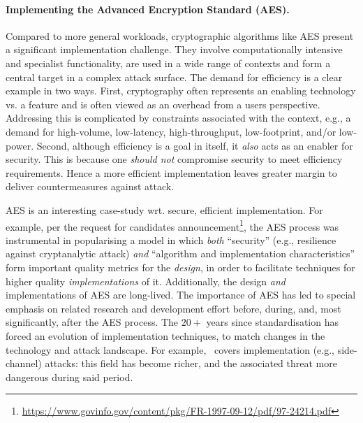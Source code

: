 
\paragraph{Implementing the Advanced Encryption Standard (AES).}

%
%

Compared to more general workloads, cryptographic algorithms like AES
present a significant implementation challenge.
They involve computationally intensive and specialist functionality,
are used in a wide range of contexts
and
form a central target in a complex attack surface.
The demand for efficiency is a clear example in two ways.
First,
cryptography often represents an enabling technology vs. a feature and
is often viewed as an overhead from a users perspective.
Addressing this is
complicated by constraints associated with the context, e.g., a demand 
for
high-volume, 
 low-latency, 
high-throughput, 
 low-footprint, 
and/or 
 low-power.
Second,
although efficiency is a goal in itself, it {\em also} 
acts as an enabler for security.
This is because one {\em should not}
compromise security to meet efficiency requirements.
Hence a more efficient implementation leaves greater margin to deliver
countermeasures against attack.

AES is an interesting case-study wrt. secure, efficient implementation.
For example,
per the request for candidates announcement\footnote{%
\url{https://www.govinfo.gov/content/pkg/FR-1997-09-12/pdf/97-24214.pdf}
}, the AES process was instrumental in popularising a model in which
{\em both}
``security''
(e.g., resilience against cryptanalytic attack)
{\em and}
``algorithm and implementation characteristics''
form important quality metrics for the {\em design}, in order to facilitate
techniques for higher quality {\em implementations} of it.
Additionally,
the design {\em and} implementations of AES are long-lived.
The importance of AES has led to special emphasis on related
research and development effort before, during, and, most significantly, 
after the AES process.
The $20+$ years since standardisation has forced an evolution of 
implementation techniques, to match changes in the technology 
and attack landscape.  For example,~\cite[Section 3.6]{NBBBDFR:01} covers
implementation (e.g., side-channel) attacks: this field has become richer,
and the associated threat more dangerous during said period.

